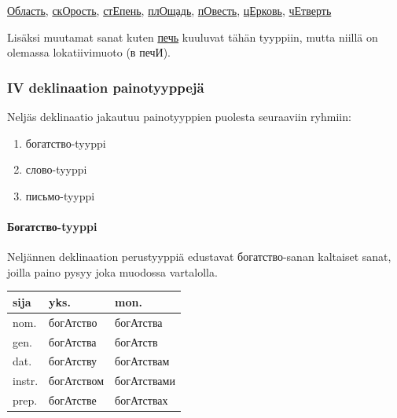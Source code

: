 \documentclass[]{scrartcl}
\providecommand{\tightlist}{%
  \setlength{\itemsep}{0pt}\setlength{\parskip}{0pt}}
\begin{document}
\begin{enumerate}
  \href{http://ru.wiktionary.org/wiki/\%D0\%BE\%D0\%B1\%D0\%BB\%D0\%B0\%D1\%81\%D1\%82\%D1\%8C}{Область},
  \href{http://ru.wiktionary.org/wiki/\%D1\%81\%D0\%BA\%D0\%BE\%D1\%80\%D0\%BE\%D1\%81\%D1\%82\%D1\%8C}{скОрость},
  \href{http://ru.wiktionary.org/wiki/\%D1\%81\%D1\%82\%D0\%B5\%D0\%BF\%D0\%B5\%D0\%BD\%D1\%8C}{стЕпень},
  \href{http://ru.wiktionary.org/wiki/\%D0\%BF\%D0\%BB\%D0\%BE\%D1\%89\%D0\%B0\%D0\%B4\%D1\%8C}{плОщадь},
  \href{http://ru.wiktionary.org/wiki/\%D0\%BF\%D0\%BE\%D0\%B2\%D0\%B5\%D1\%81\%D1\%82\%D1\%8C}{пОвесть},
  \href{http://ru.wiktionary.org/wiki/\%D1\%86\%D0\%B5\%D1\%80\%D0\%BA\%D0\%BE\%D0\%B2\%D1\%8C}{цЕрковь},
  \href{http://ru.wiktionary.org/wiki/\%D1\%87\%D0\%B5\%D1\%82\%D0\%B2\%D0\%B5\%D1\%80\%D1\%82\%D1\%8C}{чЕтверть}
\end{enumerate}

Lisäksi muutamat sanat kuten
\href{http://ru.wiktionary.org/wiki/\%D0\%BF\%D0\%B5\%D1\%87\%D1\%8C}{печь}
kuuluvat tähän tyyppiin, mutta niillä on olemassa lokatiivimuoto (в
печИ).

\subsubsection{IV deklinaation
painotyyppejä}\label{iv-deklinaation-painotyyppejuxe4}

Neljäs deklinaatio jakautuu painotyyppien puolesta seuraaviin ryhmiin:

\begin{enumerate}
\def\labelenumi{\arabic{enumi}.}
\tightlist
\item
  богатство-tyyppi
\item
  слово-tyyppi
\item
  письмо-tyyppi
\end{enumerate}

\paragraph{Богатство-tyyppi}\label{ux431ux43eux433ux430ux442ux441ux442ux432ux43e-tyyppi}

Neljännen deklinaation perustyyppiä edustavat богатство-sanan kaltaiset
sanat, joilla paino pysyy joka muodossa vartalolla.

\begin{longtable}[c]{@{}lll@{}}
\toprule
sija & yks. & mon.\tabularnewline
\midrule
\endhead
nom. & богАтство & богАтства\tabularnewline
gen. & богАтства & богАтств\tabularnewline
dat. & богАтству & богАтствам\tabularnewline
instr. & богАтством & богАтствами\tabularnewline
prep. & богАтстве & богАтствах\tabularnewline
\bottomrule
\end{longtable}
\end{document}
